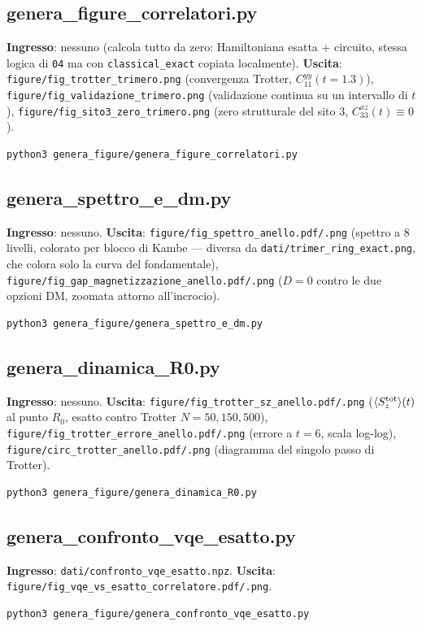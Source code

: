 \documentclass[11pt,a4paper]{article}
\begin{document}
\subsection{genera\_figure\_correlatori.py}
\textbf{Ingresso}: nessuno (calcola tutto da zero: Hamiltoniana esatta +
circuito, stessa logica di \texttt{04} ma con \texttt{classical\_exact}
copiata localmente). \textbf{Uscita}:
\texttt{figure/fig\_trotter\_trimero.png} (convergenza Trotter,
$C_{11}^{yy}(t{=}1.3)$), \texttt{figure/fig\_validazione\_trimero.png}
(validazione continua su un intervallo di $t$),
\texttt{figure/fig\_sito3\_zero\_trimero.png} (zero strutturale del sito
3, $C_{33}^{xz}(t)\equiv0$).
\begin{verbatim}
python3 genera_figure/genera_figure_correlatori.py
\end{verbatim}

\subsection{genera\_spettro\_e\_dm.py}
\textbf{Ingresso}: nessuno. \textbf{Uscita}:
\texttt{figure/fig\_spettro\_anello.pdf/.png} (spettro a 8 livelli,
colorato per blocco di Kambe --- diversa da
\texttt{dati/trimer\_ring\_exact.png}, che colora solo la curva del
fondamentale), \texttt{figure/fig\_gap\_magnetizzazione\_anello.pdf/.png}
($D{=}0$ contro le due opzioni DM, zoomata attorno all'incrocio).
\begin{verbatim}
python3 genera_figure/genera_spettro_e_dm.py
\end{verbatim}

\subsection{genera\_dinamica\_R0.py}
\textbf{Ingresso}: nessuno. \textbf{Uscita}:
\texttt{figure/fig\_trotter\_sz\_anello.pdf/.png} ($\langle S_z^{\rm
tot}\rangle(t)$ al punto $R_0$, esatto contro Trotter $N{=}50,150,500$),
\texttt{figure/fig\_trotter\_errore\_anello.pdf/.png} (errore a $t{=}6$,
scala log-log), \texttt{figure/circ\_trotter\_anello.pdf/.png} (diagramma
del singolo passo di Trotter).
\begin{verbatim}
python3 genera_figure/genera_dinamica_R0.py
\end{verbatim}

\subsection{genera\_confronto\_vqe\_esatto.py}
\textbf{Ingresso}: \texttt{dati/confronto\_vqe\_esatto.npz}.
\textbf{Uscita}: \texttt{figure/fig\_vqe\_vs\_esatto\_correlatore.pdf/.png}.
\begin{verbatim}
python3 genera_figure/genera_confronto_vqe_esatto.py
\end{verbatim}
\end{document}
